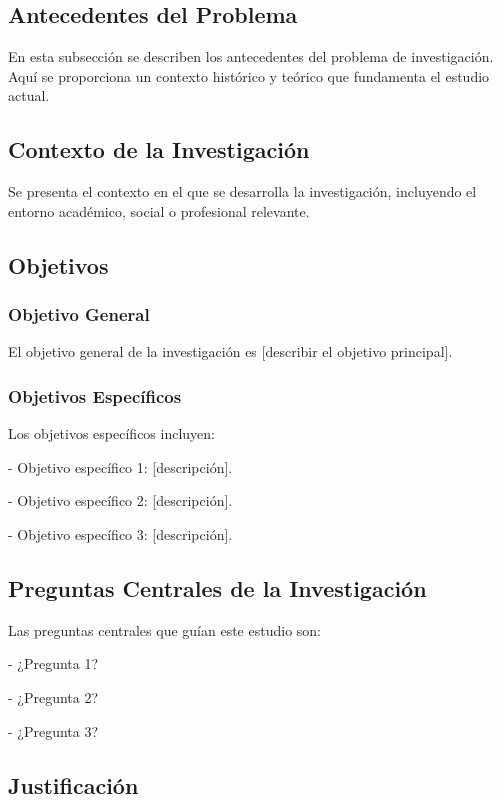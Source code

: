 
\subsection{Antecedentes del Problema}

En esta subsección se describen los antecedentes del problema de investigación. Aquí se proporciona un contexto histórico y teórico que fundamenta el estudio actual.

\subsection{Contexto de la Investigación}

Se presenta el contexto en el que se desarrolla la investigación, incluyendo el entorno académico, social o profesional relevante.

\subsection{Objetivos}

\subsubsection{Objetivo General}

El objetivo general de la investigación es [describir el objetivo principal].

\subsubsection{Objetivos Específicos}

Los objetivos específicos incluyen:

- Objetivo específico 1: [descripción].

- Objetivo específico 2: [descripción].

- Objetivo específico 3: [descripción].

\subsection{Preguntas Centrales de la Investigación}

Las preguntas centrales que guían este estudio son:

- ¿Pregunta 1?

- ¿Pregunta 2?

- ¿Pregunta 3?

\subsection{Justificación}

